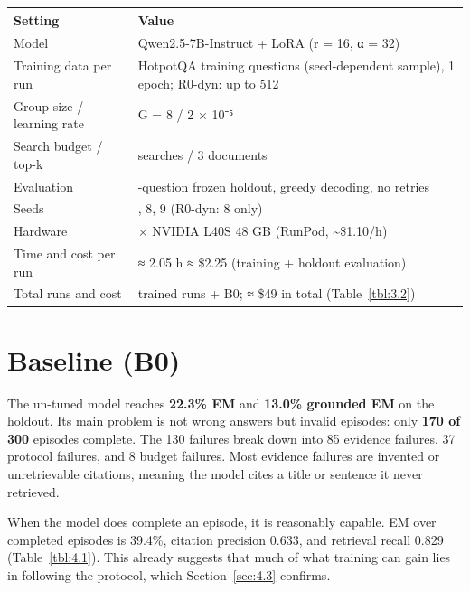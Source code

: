 {\def\LTcaptype{none} %
\begin{longtable}[]{@{}
  >{\raggedright\arraybackslash}p{}
  >{\raggedright\arraybackslash}p{}@{}}
\toprule\noalign{}
\begin{minipage}[b]{\linewidth}\raggedright
Setting
\end{minipage} & \begin{minipage}[b]{\linewidth}\raggedright
Value
\end{minipage} \\
\midrule\noalign{}
\endhead
\bottomrule\noalign{}
\endlastfoot
Model & Qwen2.5-7B-Instruct + LoRA (r = 16, α = 32) \\
Training data per run & 256 HotpotQA training questions (seed-dependent
sample), 1 epoch; R0-dyn: up to 512 \\
Group size / learning rate & G = 8 / 2 × 10⁻⁵ \\
Search budget / top-k & 3 searches / 3 documents \\
Evaluation & 300-question frozen holdout, greedy decoding, no retries \\
Seeds & 7, 8, 9 (R0-dyn: 8 only) \\
Hardware & 1 × NVIDIA L40S 48 GB (RunPod, \textasciitilde\$1.10/h) \\
Time and cost per run & ≈ 2.05 h ≈ \$2.25 (training + holdout
evaluation) \\
Total runs and cost & 16 trained runs + B0; ≈ \$49 in total
(Table~\ref{tbl:3.2}) \\
\end{longtable}
}

\section{Baseline (B0)}\label{sec:4.2}

The un-tuned model reaches \textbf{22.3\% EM} and \textbf{13.0\%
grounded EM} on the holdout. Its main problem is not wrong answers but
invalid episodes: only \textbf{170 of 300} episodes complete. The 130
failures break down into 85 evidence failures, 37 protocol failures, and
8 budget failures. Most evidence failures are invented or unretrievable
citations, meaning the model cites a title or sentence it never
retrieved.

When the model does complete an episode, it is reasonably capable. EM
over completed episodes is 39.4\%, citation precision 0.633, and
retrieval recall 0.829 (Table~\ref{tbl:4.1}). This already suggests that
much of what training can gain lies in following the protocol, which
Section~\ref{sec:4.3} confirms.

